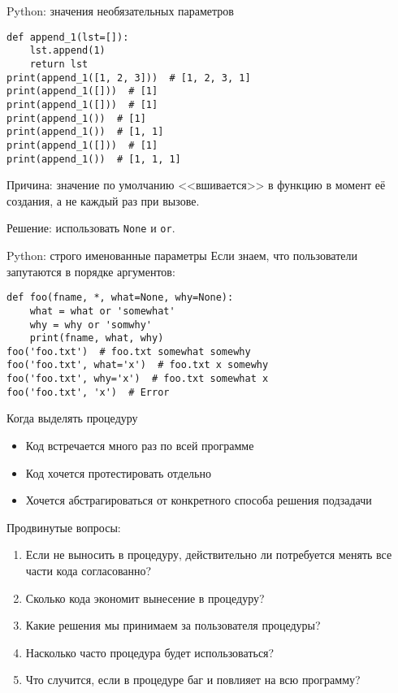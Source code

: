 \begin{frame}[t,fragile]{Python: значения необязательных параметров}
\begin{verbatim}
def append_1(lst=[]):
    lst.append(1)
    return lst
print(append_1([1, 2, 3]))  # [1, 2, 3, 1]
print(append_1([]))  # [1]
print(append_1([]))  # [1]
print(append_1())  # [1]
print(append_1())  # [1, 1]
print(append_1([]))  # [1]
print(append_1())  # [1, 1, 1]
\end{verbatim}
	Причина: значение по умолчанию <<вшивается>> в функцию в момент её создания, а не каждый раз при вызове.
	
	Решение: использовать \verb`None` и \verb`or`.
\end{frame}

\begin{frame}[t,fragile]{Python: строго именованные параметры}
	Если знаем, что пользователи запутаются в порядке аргументов:
\begin{verbatim}
def foo(fname, *, what=None, why=None):
    what = what or 'somewhat'
    why = why or 'somwhy'
    print(fname, what, why)
foo('foo.txt')  # foo.txt somewhat somewhy
foo('foo.txt', what='x')  # foo.txt x somewhy
foo('foo.txt', why='x')  # foo.txt somewhat x
foo('foo.txt', 'x')  # Error
\end{verbatim}
\end{frame}

\begin{frame}{Когда выделять процедуру}
	\begin{itemize}
	\item Код встречается много раз по всей программе
	\item Код хочется протестировать отдельно
	\item Хочется абстрагироваться от конкретного способа решения подзадачи
	\end{itemize}
	
	Продвинутые вопросы:
	\begin{enumerate}
	\item
		Если не выносить в процедуру, действительно ли потребуется
		менять все части кода согласованно?
	\item
		Сколько кода экономит вынесение в процедуру?
	\item
		Какие решения мы принимаем за пользователя процедуры?
	\item
		Насколько часто процедура будет использоваться?
	\item
		Что случится, если в процедуре баг и повлияет на всю программу?
	\end{enumerate}
\end{frame}

